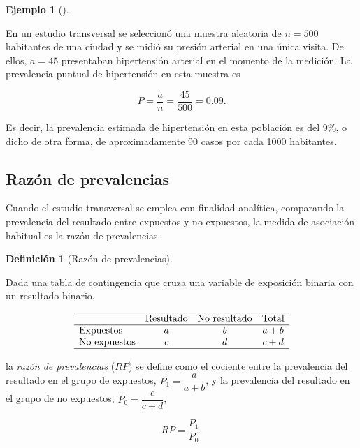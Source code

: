 \documentclass[
  spanish,
  a4paper,
]{scrreport}
\theoremstyle{definition}
\newtheorem{example}{Ejemplo}[chapter]
\theoremstyle{definition}
\newtheorem{definition}{Definición}[chapter]
\theoremstyle{remark}
\begin{document}
\begin{example}[]\protect\hypertarget{exm-transversales-prevalencia}{}\label{exm-transversales-prevalencia}

En un estudio transversal se seleccionó una muestra aleatoria de
\(n=500\) habitantes de una ciudad y se midió su presión arterial en una
única visita. De ellos, \(a=45\) presentaban hipertensión arterial en el
momento de la medición. La prevalencia puntual de hipertensión en esta
muestra es

\[P = \frac{a}{n} = \frac{45}{500} = 0.09.\]

Es decir, la prevalencia estimada de hipertensión en esta población es
del \(9\%\), o dicho de otra forma, de aproximadamente 90 casos por cada
1000 habitantes.

\end{example}

\subsection{Razón de prevalencias}\label{razuxf3n-de-prevalencias}

Cuando el estudio transversal se emplea con finalidad analítica,
comparando la prevalencia del resultado entre expuestos y no expuestos,
la medida de asociación habitual es la razón de prevalencias.

\begin{definition}[Razón de
prevalencias]\protect\hypertarget{def-transversales-razon-prevalencias}{}\label{def-transversales-razon-prevalencias}

Dada una tabla de contingencia que cruza una variable de exposición
binaria con un resultado binario,

\[
\begin{array}{lccc}
\hline
 & \mbox{Resultado} & \mbox{No resultado} & \mbox{Total}\\
\hline
\mbox{Expuestos} & a & b & a+b\\
\mbox{No expuestos} & c & d & c+d\\
\hline
\end{array}
\]

la \emph{razón de prevalencias} (\(RP\)) se define como el cociente
entre la prevalencia del resultado en el grupo de expuestos,
\(P_1 = \dfrac{a}{a+b}\), y la prevalencia del resultado en el grupo de
no expuestos, \(P_0 = \dfrac{c}{c+d}\),

\[RP = \frac{P_1}{P_0}.\]

\end{definition}
\end{document}
